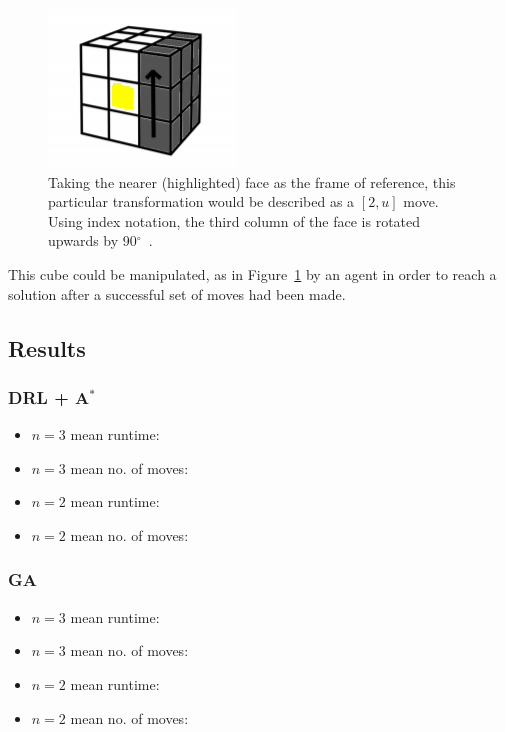 \documentclass[UKenglish]{svproc}
\begin{document}
\begin{figure}[!h]
\begin{small}
\centering
\linespread{1.0}
\includegraphics[width=0.75\linewidth]{images/move_3u}
\caption{Taking the nearer (highlighted) face as the frame of reference, this particular transformation would be described as a $[2,u]$ move. Using index notation, the third column of the face is rotated upwards by 90$^{\circ}$~\cite{proj_l.hoang}.}
\label{fig:fig2}
\end{small}
\end{figure}

This cube could be manipulated, as in Figure~\ref{fig:fig2} by an agent in order to reach a solution after a successful set of moves had been made.

\subsection{Results}


\subsubsection{DRL + A$^{\ast}$}
\begin{itemize}
    \item $n=3$ mean runtime:
    \item $n=3$ mean no. of moves:
    \item $n=2$ mean runtime:
    \item $n=2$ mean no. of moves:
\end{itemize}

\subsubsection{GA}
\begin{itemize}
    \item $n=3$ mean runtime:
    \item $n=3$ mean no. of moves:
    \item $n=2$ mean runtime:
    \item $n=2$ mean no. of moves:
\end{itemize}
\end{document}
